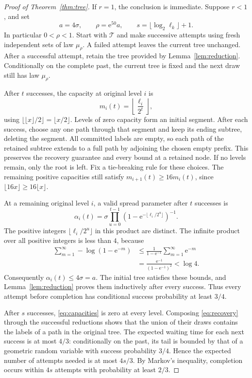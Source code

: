\documentclass[11pt]{article}
\numberwithin{equation}{section}
\newcommand{\TT}{\mathcal T}
\newcommand{\ee}{\mathrm e}
\begin{document}
\begin{proof}[Proof of Theorem~\ref{thm:tree}]
If $r=1$, the conclusion is immediate. Suppose $r<1$, and set
\[
 a=4\sigma,\qquad \rho=\ee^{50}a,
 \qquad s=\lfloor\log_2\ell_k\rfloor+1.
\]
In particular $0<\rho<1$. Start with $\TT$ and make successive
attempts using fresh independent sets of law $\mu_\rho$. A failed attempt leaves
the current tree unchanged. After a successful attempt, retain the
tree provided by Lemma~\ref{lem:reduction}.
Conditionally on the complete past, the current tree is fixed and the
next draw still has law $\mu_\rho$.

After $t$ successes, the capacity at original level $i$ is
\begin{equation}\label{eq:capacities}
 m_i(t)=\left\lfloor\frac{\ell_i}{2^t}\right\rfloor,
\end{equation}
using $\lfloor\lfloor x\rfloor/2\rfloor=\lfloor x/2\rfloor$.
Levels of zero capacity form an initial segment. After each success,
choose any one path through that segment and keep its ending
subtree, deleting the segment. All committed labels are empty, so
each path of the retained subtree extends to a full path by adjoining
the chosen empty prefix. This preserves the recovery guarantee and every
bound at a retained node. If no levels remain, only the root is left.
Fix a tie-breaking rule for these choices. The remaining positive capacities still
satisfy $m_{i+1}(t)\ge16m_i(t)$, since
$\lfloor16x\rfloor\ge16\lfloor x\rfloor$.

At a remaining original level $i$, a valid spread parameter after
$t$ successes is
\begin{equation}\label{eq:spread-iteration}
 \alpha_i(t)=\sigma
 \prod_{u=0}^{t-1}
 \left(1-\ee^{-\lfloor\ell_i/2^u\rfloor}\right)^{-1}.
\end{equation}
The positive integers $\lfloor\ell_i/2^u\rfloor$ in this product are
distinct. The infinite product over all positive integers is less
than $4$, because
\begin{align*}
 \sum_{m=1}^{\infty}-\log(1-\ee^{-m})
 &\le \frac{1}{1-\ee^{-1}}\sum_{m=1}^{\infty}\ee^{-m}\\
 &=\frac{\ee^{-1}}{(1-\ee^{-1})^2}<\log 4.
\end{align*}
Consequently $\alpha_i(t)\le4\sigma=a$. The initial tree satisfies
these bounds, and Lemma~\ref{lem:reduction} proves them inductively
after every success. Thus every attempt before completion has
conditional success probability at least $3/4$.

After $s$ successes, \eqref{eq:capacities} is zero at every level.
Composing \eqref{eq:recovery} through the successful reductions shows
that the union of their draws contains the labels of a path in the
original tree. The expected waiting time for each next success is
at most $4/3$: conditionally on the past, its tail is bounded by
that of a geometric random variable with success probability $3/4$.
Hence the expected number of attempts needed is at most $4s/3$.
By Markov's inequality, completion occurs within $4s$ attempts with
probability at least $2/3$.


\end{proof}
\end{document}
